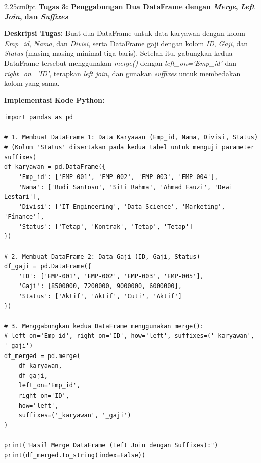 \documentclass[12pt,a4paper]{article}
\begin{document}
\newpage
{}
\begin{adjustwidth}{2.25cm}{0pt}
\hspace*{-0.75cm}\textbf{\normalsize Tugas 3: Penggabungan Dua DataFrame dengan \textit{Merge}, \textit{Left Join}, dan \textit{Suffixes}}\par
\vspace{0.12cm}

\textbf{Deskripsi Tugas:}  
Buat dua DataFrame untuk data karyawan dengan kolom \textit{Emp\_id}, \textit{Nama}, dan \textit{Divisi}, serta DataFrame gaji dengan kolom \textit{ID}, \textit{Gaji}, dan \textit{Status} (masing-masing minimal tiga baris). Setelah itu, gabungkan kedua DataFrame tersebut menggunakan \textit{merge()} dengan \textit{left\_on='Emp\_id'} dan \textit{right\_on='ID'}, terapkan \textit{left join}, dan gunakan \textit{suffixes} untuk membedakan kolom yang sama.

\vspace{0.12cm}
\textbf{Implementasi Kode Python:}
\begin{lstlisting}
import pandas as pd

# 1. Membuat DataFrame 1: Data Karyawan (Emp_id, Nama, Divisi, Status)
# (Kolom 'Status' disertakan pada kedua tabel untuk menguji parameter suffixes)
df_karyawan = pd.DataFrame({
    'Emp_id': ['EMP-001', 'EMP-002', 'EMP-003', 'EMP-004'],
    'Nama': ['Budi Santoso', 'Siti Rahma', 'Ahmad Fauzi', 'Dewi Lestari'],
    'Divisi': ['IT Engineering', 'Data Science', 'Marketing', 'Finance'],
    'Status': ['Tetap', 'Kontrak', 'Tetap', 'Tetap']
})

# 2. Membuat DataFrame 2: Data Gaji (ID, Gaji, Status)
df_gaji = pd.DataFrame({
    'ID': ['EMP-001', 'EMP-002', 'EMP-003', 'EMP-005'],
    'Gaji': [8500000, 7200000, 9000000, 6000000],
    'Status': ['Aktif', 'Aktif', 'Cuti', 'Aktif']
})

# 3. Menggabungkan kedua DataFrame menggunakan merge():
# left_on='Emp_id', right_on='ID', how='left', suffixes=('_karyawan', '_gaji')
df_merged = pd.merge(
    df_karyawan,
    df_gaji,
    left_on='Emp_id',
    right_on='ID',
    how='left',
    suffixes=('_karyawan', '_gaji')
)

print("Hasil Merge DataFrame (Left Join dengan Suffixes):")
print(df_merged.to_string(index=False))
\end{lstlisting}


\end{adjustwidth}
\end{document}
